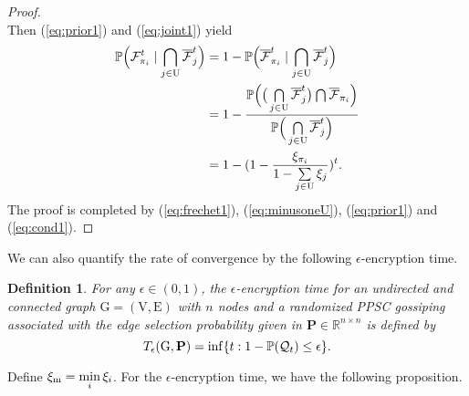 \documentclass[a4paper, 11pt]{article}
\newcommand{\R}{\mathbb{R}}
\newcommand{\1}{\mathbf{1}}
\newcommand{\Pb}{\mathbf{P}}
\newcommand{\mG}{\mathrm{G}}
\newcommand{\mV}{\mathrm{V}}
\newcommand{\mE}{\mathrm{E}}
\newcommand{\mU}{\mathrm{U}}
\newcommand*\mcap{\mathbin{\mathpalette\mcapinn\relax}}
\newcommand*\mcapinn[2]{\vcenter{\hbox{$\mathsurround=0pt
			\ifx\displaystyle#1\textstyle\else#1\fi\bigcap$}}}
\newtheorem{definition}{Definition}
\begin{document}
\begin{proof}
\begin{equation}
	\end{equation}
	Then (\ref{eq:prior1}) and (\ref{eq:joint1}) yield
	\begin{align}
	\mathbb{P}\Big(\mathcal{F}_{\pi_i}^{t}\mid\bigcap\limits_{j\in\mU} \overline{\mathcal{F}}_j^{t}\Big)&= 1-\mathbb{P}\Big(\overline{\mathcal{F}}_{\pi_i}^{t}\mid\bigcap\limits_{j\in\mU} \overline{\mathcal{F}}_j^{t}\Big)\notag\\
	&= 1-\frac{\mathbb{P}\Big(\big(\bigcap\limits_{j\in\mU} \overline{\mathcal{F}}_j^{t}\big)\mcap\overline{\mathcal{F}}_{\pi_i}\Big)}{\mathbb{P}\Big(\bigcap\limits_{j\in\mU} \overline{\mathcal{F}}_j^{t}\Big)}\notag\\
	&= 1-(1-\frac{\xi_{\pi_i}}{1-\sum\limits_{j\in\mU}\xi_j})^t\label{eq:cond1}.
	\end{align}
	The proof is completed by (\ref{eq:frechet1}), (\ref{eq:minusoneU}), (\ref{eq:prior1}) and (\ref{eq:cond1}).
\end{proof}

We can also quantify the rate of convergence by the following $\epsilon$-encryption time.
\begin{definition} \label{def:rand_encryption_time}
	For any $\epsilon\in(0,1)$, the $\epsilon$-encryption time for an undirected and connected graph $\mG=(\mV,\mE)$ with $n$ nodes and a randomized PPSC gossiping associated with the edge selection probability given in $\Pb\in\R^{n\times n}$ is defined by
	\begin{equation}\notag
	T_\epsilon(\mG,\Pb)=\inf\{t: 1-\mathbb{P}(\mathcal{Q}_t)\le\epsilon\}.
	\end{equation}
\end{definition}
Define $\xi_{\rm m}=\min\limits_i \xi_i$. For the $\epsilon$-encryption time, we have the following proposition.

\medskip
\end{document}
